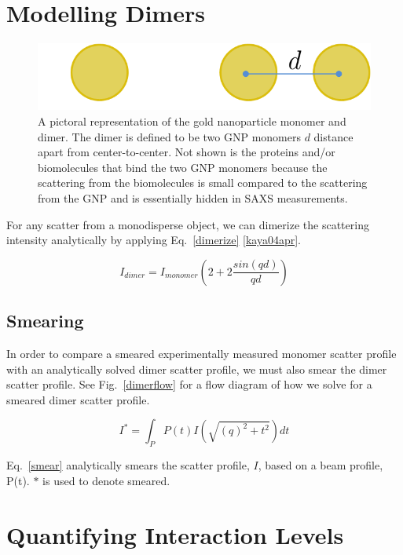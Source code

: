 \documentclass[10pt]{article}%
\begin{document}
\section{Modelling Dimers}

\begin{figure}
\centering
\includegraphics[scale=.3]{images/diagram.png}
\caption{A pictoral representation of the gold nanoparticle monomer and dimer.  The dimer is defined to be two GNP monomers $d$ distance apart from center-to-center. Not shown is the proteins and/or biomolecules that bind the two GNP monomers because the scattering from the biomolecules is small compared to the scattering from the GNP and is essentially hidden in SAXS measurements.}
\end{figure}

For any scatter from a monodisperse object, we can dimerize the scattering intensity analytically by applying Eq.~\ref{dimerize} \ref{kaya04apr}.

\begin{equation}
I_{dimer}=I_{monomer}(2+2\frac{sin(qd)}{qd})
\label{dimerize}
\end{equation}

\subsection{Smearing}
In order to compare a smeared experimentally measured monomer scatter profile with an analytically solved dimer scatter profile, we must also smear the dimer scatter profile. See Fig.~\ref{dimerflow} for a flow diagram of how we solve for a smeared dimer scatter profile. 

\begin{equation}
I^{*} =\int_P P(t) I(\sqrt{(q)^2+t^2}) dt 
\label{smear}
\end{equation}

Eq.~\ref{smear} analytically smears the scatter profile, $I$, based on a beam profile, P(t). $*$ is used to denote smeared. 
\section{Quantifying Interaction Levels}
\end{document}
